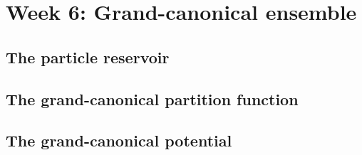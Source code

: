 \renewcommand{\thisweek}{MATH327 Week 6}
\renewcommand{\moddate}{Last modified 3 Feb.~2021}
\setcounter{section}{6}
\setcounter{subsection}{0}
{}
\section*{Week 6: Grand-canonical ensemble}

\subsection{The particle reservoir}



\newpage %
\subsection{The grand-canonical partition function}



\newpage %
\subsection{The grand-canonical potential}
